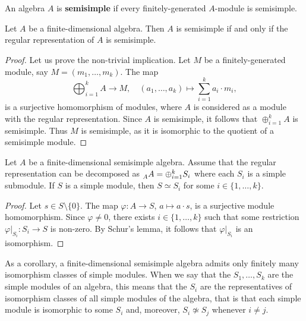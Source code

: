 \chapter{}

\begin{definition}
    An algebra $A$ is \textbf{semisimple} if every finitely-generated $A$-module is semisimple. 
\end{definition}

\begin{proposition}
Let $A$ be a finite-dimensional algebra. Then $A$ is semisimple if and only if 
the regular representation of $A$ is semisimple. 
\end{proposition}

\begin{proof}
Let us prove the non-trivial implication. Let $M$ be a finitely-generated module, say $M=(m_1,\dots,m_k)$. 
The map
\[
\bigoplus_{i=1}^k A\to M,\quad
(a_1,\dots,a_k)\mapsto \sum_{i=1}^k a_i\cdot m_i,
\]
is a surjective homomorphism of modules, where $A$ is considered as a module with the regular
representation. Since 
$A$ is semisimple, it follows that $\oplus_{i=1}^kA$ is semisimple. 
Thus $M$ is semisimple, as it is isomorphic to the quotient of a semisimple module.
\end{proof}

\begin{theorem}
Let $A$ be a finite-dimensional semisimple algebra. 
Assume that the regular representation can be decomposed as $\prescript{}{A}A=\oplus_{i=1}^k S_i$ where each $S_i$ is a simple submodule.  
If $S$ is a simple module, then $S\simeq S_i$ for some $i\in\{1,\dots,k\}$. 
\end{theorem}

\begin{proof}
Let $s\in S\setminus\{0\}$. The map $\varphi\colon A\to S$, $a\mapsto a\cdot s$, is a surjective module homomorphism. Since 
$\varphi\ne 0$, there exists $i\in\{1,\dots,k\}$ such that some restriction 
$\varphi|_{S_i}\colon S_i\to S$ is non-zero. By Schur's lemma, it follows that  
$\varphi|_{S_i}$ is an isomorphism.   	
\end{proof}

As a corollary, a finite-dimensional semisimple algebra admits 
only finitely many isomorphism classes of simple modules. When we say that 
the $S_1,\dots,S_k$ are the simple modules of an algebra, this means that the $S_i$ are the representatives
of isomorphism classes of all simple modules of the algebra, that is that each simple module is isomorphic to
some $S_i$ and, moreover,  
$S_i\not\simeq S_j$ whenever $i\ne j$. 

